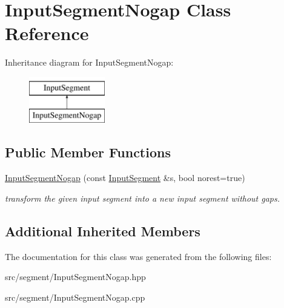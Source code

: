 \hypertarget{classInputSegmentNogap}{}\section{Input\+Segment\+Nogap Class Reference}
\label{classInputSegmentNogap}
Inheritance diagram for Input\+Segment\+Nogap\+:\begin{figure}[H]
\begin{center}
\leavevmode
\includegraphics[height=2.000000cm]{classInputSegmentNogap}
\end{center}
\end{figure}
\subsection*{Public Member Functions}
\begin{DoxyCompactItemize}
\item 
\mbox{\hyperlink{group__segment_gaa05ab07eeaf10f35e57552ab045ac548}{Input\+Segment\+Nogap}} (const \mbox{\hyperlink{classInputSegment}{Input\+Segment}} \&s, bool norest=true)
\begin{DoxyCompactList}\small\item\em transform the given input segment into a new input segment without gaps. \end{DoxyCompactList}\end{DoxyCompactItemize}
\subsection*{Additional Inherited Members}


The documentation for this class was generated from the following files\+:\begin{DoxyCompactItemize}
\item 
src/segment/Input\+Segment\+Nogap.\+hpp\item 
src/segment/Input\+Segment\+Nogap.\+cpp\end{DoxyCompactItemize}
